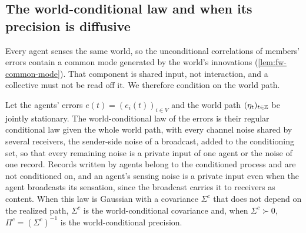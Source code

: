 \subsection{The world-conditional law and when its precision is diffusive}\label{sec:col-world}

Every agent senses the same world, so the unconditional correlations of members' errors contain a common mode generated by the world's innovations (\cref{lem:fw-common-mode}). That component is shared input, not interaction, and a collective must not be read off it. We therefore condition on the world path.

\begin{definition}\label{def:col-world-conditional}
Let the agents' errors $e(t)=(e_i(t))_{i\in V}$ and the world path $(\eta_t)_{t\in\mathbb{Z}}$ be jointly stationary. The world-conditional law of the errors is their regular conditional law given the whole world path, with every channel noise shared by several receivers, the sender-side noise of a broadcast, added to the conditioning set, so that every remaining noise is a private input of one agent or the noise of one record. Records written by agents belong to the conditioned process and are not conditioned on, and an agent's sensing noise is a private input even when the agent broadcasts its sensation, since the broadcast carries it to receivers as content. When this law is Gaussian with a covariance $\Sigma^c$ that does not depend on the realized path, $\Sigma^c$ is the world-conditional covariance and, when $\Sigma^c\succ0$, $\Pi^c=(\Sigma^c)^{-1}$ is the world-conditional precision.
\end{definition}

